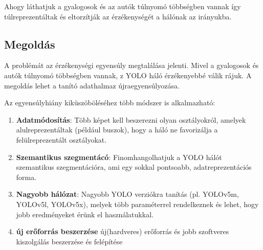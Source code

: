 \documentclass[12pt,oneside,a4paper]{article}
\theoremstyle{remark}
\begin{document}
Ahogy láthatjuk a gyalogosok és az autók túlnyomó többségben vannak így túlreprezentáltak és eltorzítják az
érzékenységét a hálónak az irányukba.

\subsection{Megoldás}\label{subsec:megoldas}
A problémát az érzékenységi egyensúly megtalálása jelenti.
Mivel a gyalogosok és autók túlnyomó többségben
vannak, z YOLO háló érzékenyebbé válik rájuk.
A megoldás lehet a tanító adathalmaz újraegyensúlyozása.

Az egyensúlyhiány kiküszöböléséhez több módszer is alkalmazható:
\begin{enumerate}
    \item \textbf{Adatmódosítás}: Több képet kell beszerezni olyan osztályokról, amelyek alulreprezentáltak (például buszok),
hogy a háló ne favorizálja a felülreprezentált osztályokat.
    \item \textbf{ Szemantikus szegmentácó}: Finomhangolhatjuk a YOLO hálót szemantikus szegmentációra, ami egy sokkal pontsoabb,
    adatreprezentációs forma.
    \item  \textbf{Nagyobb hálózat}: Nagyobb YOLO verziókra tanítás (pl. YOLOv5m, YOLOv5l, YOLOv5x),
melyek több paraméterrel rendelkeznek és lehet, hogy jobb eredményeket érünk el használatukkal.
    \item  \textbf{új erőforrás beszerzése} új(hardveres) erőforrás és jobb szoftveres kiszolgálás beszerzése és felépítése
\end{enumerate}

\newpage
\end{document}

